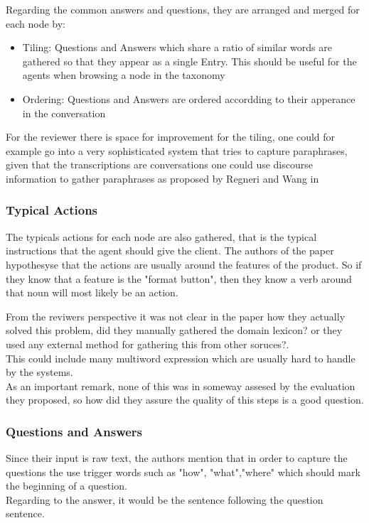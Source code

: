\documentclass[4pt,a4paper]{article}
\begin{document}
Regarding the common answers and questions, they are arranged and merged for each node by:
\begin{itemize}
	\item Tiling:  Questions and Answers which share a ratio of similar words are gathered so that they appear as a single
				  Entry. This should be useful for the agents when browsing a node in the taxonomy
	\item Ordering: Questions and Answers are ordered accordding to their apperance in the conversation
\end{itemize}


For the reviewer there is space for improvement for the tiling, one could for example go into a very sophisticated system that tries to capture paraphrases, given that the transcriptions are conversations one could use discourse information to gather paraphrases as proposed by Regneri and Wang in ~\cite{pub6382}

\subsubsection*{Typical Actions}
The typicals actions for each node are also gathered, that is the typical instructions that the agent should give the client.
The authors of the paper hypothesyse that the actions are usually around the features of the product. So if they know that a feature is the "format button", then they know a verb around that noun will most likely  be an action.

From the reviwers perspective it was not clear in the paper how they actually solved this problem, did they manually gathered the domain lexicon? or they used any external method for gathering this from other soruces?.\\
This could include many multiword expression which are usually hard to handle by the systems.\\
As an important remark, none of this was in someway assesed by the evaluation they proposed, so how did they assure the quality of this steps is a  good question.


\subsubsection*{Questions and Answers}
Since their input is raw text, the authors mention that in order to capture the questions the use trigger words such as "how", "what","where" which should mark the beginning of a question.\\
Regarding to the answer, it would be the sentence following the question sentence.
\end{document}
